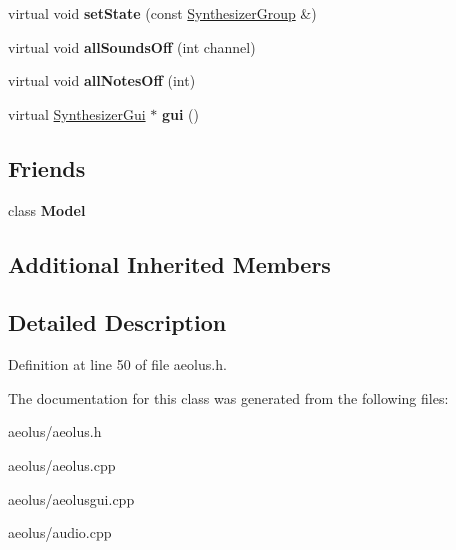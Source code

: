 \begin{DoxyCompactItemize}
virtual void {\bfseries set\+State} (const \hyperlink{class_ms_1_1_synthesizer_group}{Synthesizer\+Group} \&)
\item 
\mbox{\label{class_aeolus_af78d95b452968d61ee8926fe1ae1d436}} 
virtual void {\bfseries all\+Sounds\+Off} (int channel)
\item 
\mbox{\label{class_aeolus_a8e581e4bbfcbc6678b2a7f958785064e}} 
virtual void {\bfseries all\+Notes\+Off} (int)
\item 
\mbox{\label{class_aeolus_a9b5f1a6622d2fef850faa637f9405843}} 
virtual \hyperlink{class_ms_1_1_synthesizer_gui}{Synthesizer\+Gui} $\ast$ {\bfseries gui} ()
\end{DoxyCompactItemize}
\subsection*{Friends}
\begin{DoxyCompactItemize}
\item 
\mbox{\label{class_aeolus_a2bf2a0e9b454c55aa5dcb5aa4698697b}} 
class {\bfseries Model}
\end{DoxyCompactItemize}
\subsection*{Additional Inherited Members}


\subsection{Detailed Description}


Definition at line 50 of file aeolus.\+h.



The documentation for this class was generated from the following files\+:\begin{DoxyCompactItemize}
\item 
aeolus/aeolus.\+h\item 
aeolus/aeolus.\+cpp\item 
aeolus/aeolusgui.\+cpp\item 
aeolus/audio.\+cpp\end{DoxyCompactItemize}
